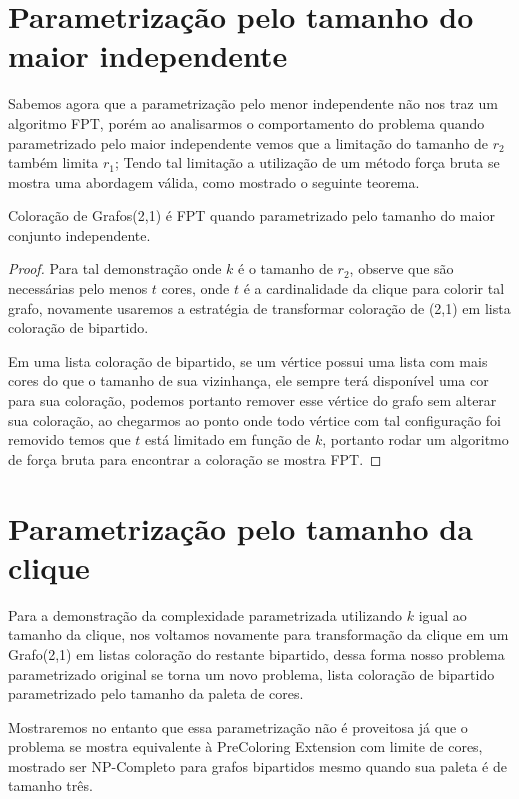 \section{Parametrização pelo tamanho do maior independente}

 Sabemos agora que a parametrização pelo menor independente não nos traz um algoritmo FPT, porém ao analisarmos o comportamento do problema quando parametrizado pelo maior independente vemos que a limitação do tamanho de $r_2$ também limita $r_1$; Tendo tal limitação a utilização de um método força bruta se mostra uma abordagem válida, como mostrado o seguinte teorema.
\begin{teorema}
  Coloração de Grafos(2,1) é FPT quando parametrizado pelo tamanho do maior conjunto independente.
\end{teorema}
\begin{proof}
  Para tal demonstração onde $k$ é o tamanho de $r_2$, observe que são necessárias pelo menos $t$ cores, onde $t$ é a cardinalidade da clique para colorir tal grafo, novamente usaremos a estratégia de transformar coloração de (2,1) em lista coloração de bipartido.
  
  Em uma lista coloração de bipartido, se um vértice possui uma lista com mais cores do que o tamanho de sua vizinhança, ele sempre terá disponível uma cor para sua coloração, podemos portanto remover esse vértice do grafo sem alterar sua coloração, ao chegarmos ao ponto onde todo vértice com tal configuração foi removido temos que $t$ está limitado em função de $k$, portanto rodar um algoritmo de força bruta para encontrar a coloração se mostra FPT.     
\end{proof}

\section{Parametrização pelo tamanho da clique}

Para a demonstração da complexidade parametrizada utilizando $k$ igual ao tamanho da clique, nos voltamos novamente para transformação da clique em um Grafo(2,1) em listas coloração do restante bipartido, dessa forma nosso problema parametrizado original se torna um novo problema, lista coloração de bipartido parametrizado pelo tamanho da paleta de cores. 

Mostraremos no entanto que essa parametrização não é proveitosa já que o problema se mostra equivalente à PreColoring Extension com limite de cores, mostrado ser NP-Completo para grafos bipartidos mesmo quando sua paleta é de tamanho três\cite{kratochvil94}.

